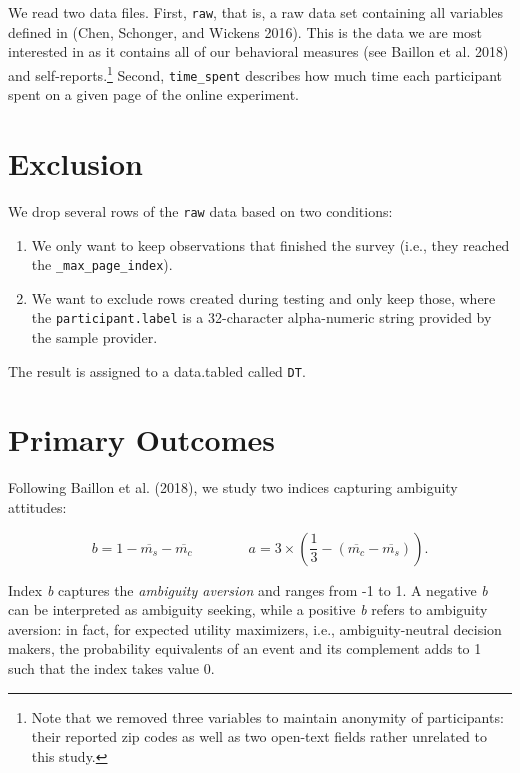 \documentclass[
  a4paper,
  DIV=11,
  numbers=noendperiod]{scrreprt}
\providecommand{\tightlist}{%
  \setlength{\itemsep}{0pt}\setlength{\parskip}{0pt}}\usepackage{longtable,booktabs,array}
\begin{document}
We read two data files. First, \texttt{raw}, that is, a raw data set
containing all variables defined in (Chen, Schonger, and Wickens 2016).
This is the data we are most interested in as it contains all of our
behavioral measures (see Baillon et al. 2018) and
self-reports.\footnote{Note that we removed three variables to maintain
  anonymity of participants: their reported zip codes as well as two
  open-text fields rather unrelated to this study.} Second,
\texttt{time\_spent} describes how much time each participant spent on a
given page of the online experiment.

\hypertarget{exclusion}{%
\section{Exclusion}\label{exclusion}}

We drop several rows of the \texttt{raw} data based on two conditions:

\begin{enumerate}
\def\labelenumi{\arabic{enumi}.}
\tightlist
\item
  We only want to keep observations that finished the survey (i.e., they
  reached the \texttt{\_max\_page\_index}).
\item
  We want to exclude rows created during testing and only keep those,
  where the \texttt{participant.label} is a 32-character alpha-numeric
  string provided by the sample provider.
\end{enumerate}

The result is assigned to a data.tabled called \texttt{DT}.

\hypertarget{primary-outcomes}{%
\section{Primary Outcomes}\label{primary-outcomes}}

Following Baillon et al. (2018), we study two indices capturing
ambiguity attitudes:

\[
b=1-\overline{m_s}-\overline{m_c} \qquad \qquad a= 3 \times (\frac{1}{3} -(\overline{m_c}-\overline{m_s})).
\]

Index \emph{b} captures the \emph{ambiguity aversion} and ranges from -1
to 1. A negative \emph{b} can be interpreted as ambiguity seeking, while
a positive \emph{b} refers to ambiguity aversion: in fact, for expected
utility maximizers, i.e., ambiguity-neutral decision makers, the
probability equivalents of an event and its complement adds to 1 such
that the index takes value 0.
\end{document}
